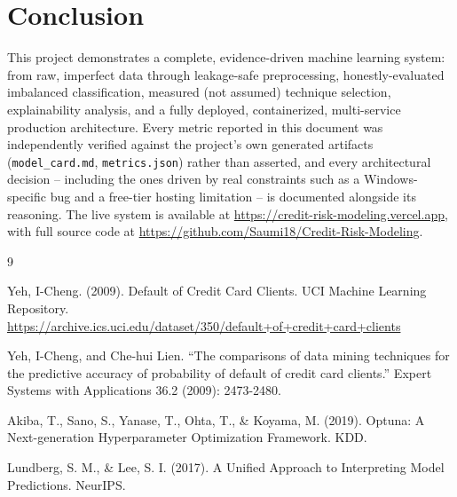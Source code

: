 \documentclass[11pt]{article}
\begin{document}
\section{Conclusion}

This project demonstrates a complete, evidence-driven machine learning
system: from raw, imperfect data through leakage-safe preprocessing,
honestly-evaluated imbalanced classification, measured (not assumed)
technique selection, explainability analysis, and a fully deployed,
containerized, multi-service production architecture. Every metric
reported in this document was independently verified against the
project's own generated artifacts (\texttt{model\_card.md},
\texttt{metrics.json}) rather than asserted, and every architectural
decision -- including the ones driven by real constraints such as a
Windows-specific bug and a free-tier hosting limitation -- is documented
alongside its reasoning. The live system is available at
\url{https://credit-risk-modeling.vercel.app}, with full source code at
\url{https://github.com/Saumi18/Credit-Risk-Modeling}.

\begin{thebibliography}{9}

Yeh, I-Cheng. (2009). Default of Credit Card Clients. UCI Machine Learning
Repository. \url{https://archive.ics.uci.edu/dataset/350/default+of+credit+card+clients}

Yeh, I-Cheng, and Che-hui Lien. ``The comparisons of data mining techniques
for the predictive accuracy of probability of default of credit card
clients.'' Expert Systems with Applications 36.2 (2009): 2473-2480.

Akiba, T., Sano, S., Yanase, T., Ohta, T., \& Koyama, M. (2019). Optuna: A
Next-generation Hyperparameter Optimization Framework. KDD.

Lundberg, S. M., \& Lee, S. I. (2017). A Unified Approach to Interpreting
Model Predictions. NeurIPS.

\end{thebibliography}
\end{document}

